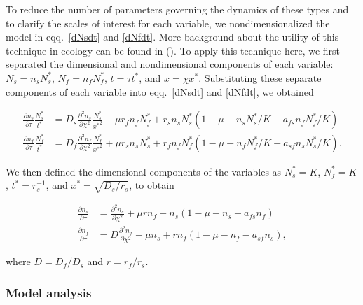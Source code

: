 \documentclass[11pt]{article}
\newcommand{\CiteT}[1]{\citeauthor{#1} (\citeyear{#1})}
\begin{document}
To reduce the number of parameters governing the dynamics of these types and to clarify the scales of interest for each variable, we nondimensionalized the model in eqq.~\eqref{dNsdt} and \eqref{dNfdt}. More background about the utility of this technique in ecology can be found in \CiteT{Petersen2001}. To apply this technique here, we first separated the dimensional and nondimensional components of each variable: $N_s = n_s N_s ^ *$, $N_f = n_f N_f ^ *$, $t = \tau t ^ *$, and $x = \chi x ^ *$. Substituting these separate components of each variable into eqq.~\eqref{dNsdt} and \eqref{dNfdt}, we obtained

\vspace*{-22pt}
\begin{subequations}
\begin{align}
\frac{\partial n_s}{\partial \tau} \frac{N_s^*}{t^*} &= D_s \frac{\partial ^ 2 n_s}{\partial \chi ^ 2} \frac{N_s^*}{{x^*}^2} + \mu r_f n_f N_f^* + r_s n_s N_s^* \left(1 - \mu - n_s N_s^* / K - a_{fs} n_f N_f^* / K \right) \label{dnNsdt} \\
\frac{\partial n_f}{\partial \tau} \frac{N_f^*}{t^*} &= D_f \frac{\partial ^ 2 n_f}{\partial \chi ^ 2} \frac{N_f^*}{{x^*}^2} + \mu r_s n_s N_s^* + r_f n_f N_f^* \left(1 - \mu - n_f N_f^* / K - a_{sf} n_s N_s^* / K \right) \label{dnNfdt}.
\end{align}
\end{subequations}

\noindent We then defined the dimensional components of the variables as $N_s^* = K$, $N_f^* = K$, $t^* = r_s ^ {-1}$, and $x^* = \sqrt{D_s/r_s}$, to obtain

\vspace*{-22pt}
\begin{subequations}
\begin{align}
\frac{\partial n_s}{\partial \tau} &= \frac{\partial ^ 2 n_s}{\partial \chi ^ 2} + \mu r n_f + n_s \left(1 - \mu - n_s - a_{fs} n_f \right) \label{dnsdt} \\
\frac{\partial n_f}{\partial \tau} &= D \frac{\partial ^ 2 n_f}{\partial \chi ^ 2} + \mu n_s + r n_f \left(1 - \mu - n_f - a_{sf} n_s \right) \label{dnfdt},
\end{align}
\end{subequations}

\noindent where $D = D_f / D_s$ and $r = r_f / r_s$.

\subsubsection*{Model analysis}
\end{document}
